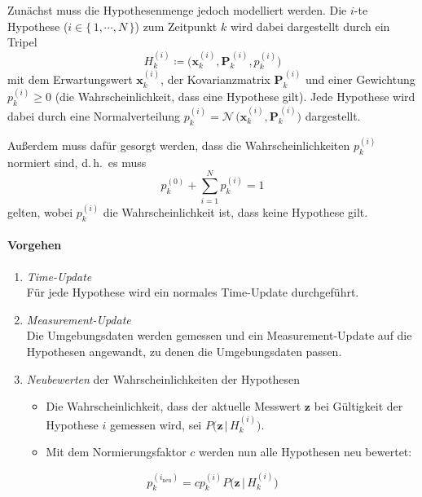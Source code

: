 \documentclass[a4paper, 11pt, accentcolor = tud3b]{tudreport}
\newcommand{\mat}[1]{\boldsymbol{#1}}
\renewcommand{\vec}[1]{\boldsymbol{\mathbf{#1}}}
\renewcommand{\dh}{d.\,h.~}
\begin{document}
					Zunächst muss die Hypothesenmenge jedoch modelliert werden. Die \(i\)-te Hypothese (\( i \in \{\, 1, \cdots, N \,\} \)) zum Zeitpunkt \(k\) wird dabei dargestellt durch ein Tripel
					\begin{equation*}
						H_k^{(i)} \coloneqq \Big( \vec{x}_k^{(i)}, \mat{P}_k^{\,(i)}, p_k^{(i)} \Big)
					\end{equation*}
					mit dem Erwartungswert \( \vec{x}_k^{(i)} \), der Kovarianzmatrix \( \mat{P}_k^{\,(i)} \) und einer Gewichtung \( p_k^{(i)} \geq 0 \) (die Wahrscheinlichkeit, dass eine Hypothese gilt). Jede Hypothese wird dabei durch eine Normalverteilung \( p_k^{(i)} = \mathcal{N}\,\Big( \vec{x}_k^{(i)}, \mat{P}_k^{\,(i)} \Big) \) dargestellt.
					
					Außerdem muss dafür gesorgt werden, dass die Wahrscheinlichkeiten \( p_k^{(i)} \) normiert sind, \dh es muss
					\begin{equation*}
						p_k^{(0)} + \sum_{i = 1}^{N} p_k^{(i)} = 1
					\end{equation*}
					gelten, wobei \( p_k^{(i)} \) die Wahrscheinlichkeit ist, dass keine Hypothese gilt.
					
					\paragraph{Vorgehen}
						\begin{enumerate}
							\item \emph{Time-Update} \\ Für jede Hypothese wird ein normales Time-Update durchgeführt.
							\item \emph{Measurement-Update} \\ Die Umgebungsdaten werden gemessen und ein Measurement-Update auf die Hypothesen angewandt, zu denen die Umgebungsdaten passen.
							\item \emph{Neubewerten} der Wahrscheinlichkeiten der Hypothesen
								\begin{itemize}
									\item Die Wahrscheinlichkeit, dass der aktuelle Messwert \( \vec{z} \) bei Gültigkeit der Hypothese \( i \) gemessen wird, sei \( P\Big(\vec{z} \,\big\vert\, H_k^{(i)}\Big) \).
									\item Mit dem Normierungsfaktor \(c\) werden nun alle Hypothesen neu bewertet:
								\end{itemize}
						\end{enumerate}
						\begin{equation*}
							p_k^{(i_\text{neu})} = c p_k^{(i)} P\Big(\vec{z} \,\big\vert\, H_k^{(i)}\Big)
						\end{equation*}
						
\end{document}
